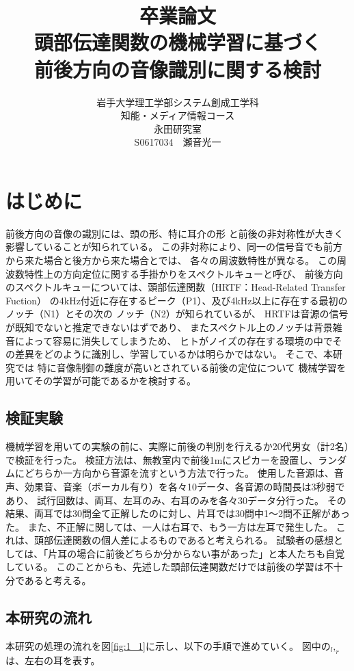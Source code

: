 \documentclass[autodetect-engine,12pt,titlepagedvi=dvipdfmx,ja=standard]{bxjsreport}
\title{卒業論文\\頭部伝達関数の機械学習に基づく\\
前後方向の音像識別に関する検討}
\author{岩手大学理工学部システム創成工学科\\
知能・メディア情報コース\\永田研究室\\S0617034　瀬音光一}
\date{}
\begin{document}
\maketitle
\tableofcontents

\chapter{はじめに}

前後方向の音像の識別には、頭の形、特に耳介の形
と前後の非対称性が大きく影響していることが知られている。
この非対称により、同一の信号音でも前方から来た場合と後方から来た場合とでは、
各々の周波数特性が異なる。
この周波数特性上の方向定位に関する手掛かりをスペクトルキューと呼び、
前後方向のスペクトルキューについては、頭部伝達関数（HRTF：Head-Related Transfer Fuction）
の4kHz付近に存在するピーク（P1）、及び4kHz以上に存在する最初のノッチ（N1）とその次の
ノッチ（N2）が知られているが\cite{K}、
HRTFは音源の信号が既知でないと推定できないはずであり、
またスペクトル上のノッチは背景雑音によって容易に消失してしまうため、
ヒトがノイズの存在する環境の中でその差異をどのように識別し、学習しているかは明らかではない。
そこで、本研究では
特に音像制御の難度が高いとされている前後の定位\cite{K2}について
機械学習を用いてその学習が可能であるかを検討する。

\section{検証実験}
機械学習を用いての実験の前に、実際に前後の判別を行えるか20代男女（計2名）で検証を行った。
検証方法は、無教室内で前後1mにスピカーを設置し、ランダムにどちらか一方向から音源を流すという方法で行った。
使用した音源は、音声、効果音、音楽（ボーカル有り）を各々10データ、各音源の時間長は3秒弱であり、
試行回数は、両耳、左耳のみ、右耳のみを各々30データ分行った。
その結果、両耳では30問全て正解したのに対し、片耳では30問中1〜2問不正解があった。
また、不正解に関しては、一人は右耳で、もう一方は左耳で発生した。
これは、頭部伝達関数の個人差によるものであると考えられる。
試験者の感想としては、「片耳の場合に前後どちらか分からない事があった」と本人たちも自覚している。
このことからも、先述した頭部伝達関数だけでは前後の学習は不十分であると考える。


\section{本研究の流れ}
本研究の処理の流れを図\ref{fig:1_1}に示し、以下の手順で進めていく。
図中の$_l,_r$は、左右の耳を表す。
\end{document}

